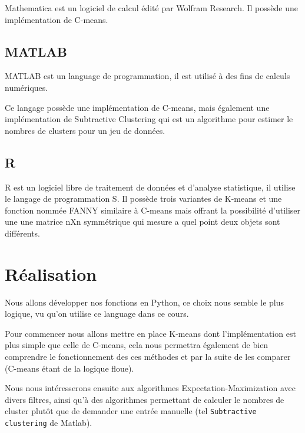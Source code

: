 \documentclass{article}
\begin{document}
  Mathematica est un logiciel de calcul édité par Wolfram Research. Il possède une implémentation de C-means.

  \subsection{MATLAB}

  MATLAB est un language de programmation, il est utilisé à des fins de calculs numériques.

  Ce langage possède une implémentation de C-means,
  mais également une implémentation de Subtractive Clustering
  qui est un algorithme pour estimer le nombres de clusters pour un jeu de données.


  \subsection{R}

  R est un logiciel libre de traitement de données et d'analyse statistique, il utilise le langage de programmation S.
  Il possède trois variantes de K-means et une fonction nommée FANNY similaire à C-means mais offrant la possibilité d'utiliser une
  une matrice nXn symmétrique qui mesure a quel point deux objets sont différents.


  \section{Réalisation}

  Nous allons développer nos fonctions en Python, ce choix nous semble le plus logique, vu qu'on utilise ce language dans ce cours.

  Pour commencer nous allons mettre en place K-means dont l'implémentation est plus simple que celle de C-means,
  cela nous permettra également de bien comprendre le fonctionnement des ces méthodes et par la suite de les comparer (C-means étant de la logique floue).

  Nous nous intéresserons ensuite aux algorithmes Expectation-Maximization avec divers filtres, ainsi qu'à des algorithmes permettant de calculer le nombres de cluster plutôt que de demander une entrée manuelle (tel \texttt{Subtractive clustering} de Matlab).
\end{document}
